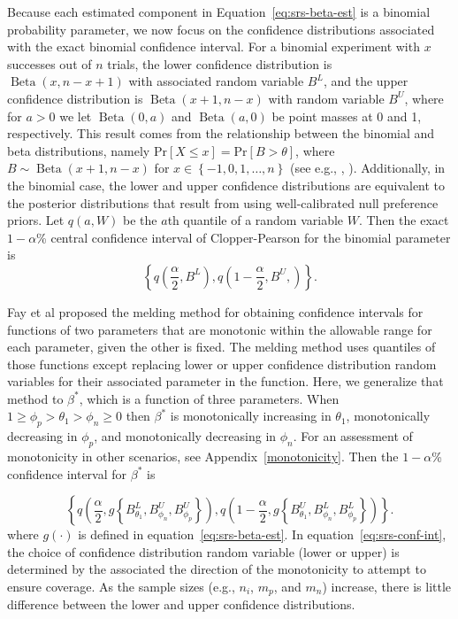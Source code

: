 Because each estimated component in Equation~\ref{eq:srs-beta-est} is a binomial probability parameter, we now focus on the confidence distributions associated with the exact binomial confidence interval.
For a binomial experiment with \( x \) successes out of \( n \) trials, the lower confidence distribution is \( \operatorname{Beta}(x, n - x + 1) \) with associated random variable \( B^L \), and the upper confidence distribution is \( \operatorname{Beta}(x + 1, n - x)\) with random variable \( B^U \), where for $a>0$ we let \( \operatorname{Beta}(0,a) \) and \( \operatorname{Beta}(a,0) \) be point masses at 0 and 1, respectively.
This result comes from the relationship between the binomial and beta distributions, namely $\mathrm{Pr}[X \leq x] = \mathrm{Pr}[B > \theta]$, where $B \sim \operatorname{Beta}(x + 1, n - x)$ for $x \in \left\{ -1,0, 1, \ldots, n \right\}$ (see e.g., \cite[Section~2]{Blyth1986}, \cite[Section~S2]{Fay2021}).
Additionally, in the binomial case, the lower and upper confidence distributions are equivalent to
the posterior distributions that result from using well-calibrated null preference priors.\cite{Fay2021}
Let \( q(a, W) \) be the \( a \)th quantile of a random variable \( W \). Then the exact \( 1 - \alpha \)\% central confidence interval of Clopper-Pearson\cite{10.1093/biomet/26.4.404} for the binomial parameter is
\begin{equation}
\left\{ q \left( \frac{\alpha}{2}, B^L \right), q \left( 1 - \frac{\alpha}{2}, B^U, \right) \right\}.
\label{eq:C-P}
\end{equation}

Fay et al\cite{FayP:2015} proposed the melding method for obtaining confidence intervals for functions of two parameters that are monotonic within the allowable range for each parameter, given the other is fixed.
The melding method uses quantiles of those functions except replacing lower or upper confidence distribution random variables for their associated parameter in the function.
Here, we generalize that method to $\beta^*$, which is a function of three parameters.
When $1 \geq \phi_p > \theta_1 > \phi_n \geq 0$ then $\beta^*$ is monotonically increasing in $\theta_1$, monotonically decreasing in $\phi_p$, and monotonically decreasing in $\phi_n$.
For an assessment of monotonicity in other scenarios, see Appendix~\ref{monotonicity}.
Then the \( 1-\alpha \)\% confidence interval for \( \beta^* \) is

\begin{equation}
    \left\{ q \left( \frac{\alpha}{2}, g \left\{ B_{\theta_1}^L, B_{\phi_n}^U, B_{\phi_p}^U \right\} \right),
            q \left( 1 - \frac{\alpha}{2}, g \left\{ B_{\theta_1}^U, B_{\phi_n}^L, B_{\phi_p}^L \right\}   \right) \right\}.
\label{eq:srs-conf-int}
\end{equation}
where $g(\cdot)$ is defined in equation~\ref{eq:srs-beta-est}.
In equation~\ref{eq:srs-conf-int}, the choice of confidence distribution random variable (lower or upper) is determined by the associated the direction of the monotonicity to attempt to ensure coverage.
As the sample sizes (e.g., $n_i$, $m_p$, and $m_n$) increase, there is little difference between the lower and upper confidence distributions.


